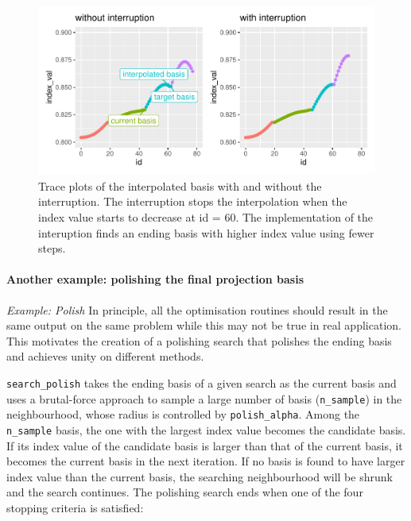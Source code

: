 \documentclass[12pt]{article}
\begin{document}
\begin{figure}
\centering
\includegraphics{paper_files/figure-latex/interruption-1.pdf}
\caption{\label{interruption}Trace plots of the interpolated basis with
and without the interruption. The interruption stops the interpolation
when the index value starts to decrease at id = 60. The implementation
of the interuption finds an ending basis with higher index value using
fewer steps.}
\end{figure}

\hypertarget{another-example-polishing-the-final-projection-basis}{%
\paragraph{Another example: polishing the final projection
basis}\label{another-example-polishing-the-final-projection-basis}}

\emph{Example: Polish} In principle, all the optimisation routines
should result in the same output on the same problem while this may not
be true in real application. This motivates the creation of a polishing
search that polishes the ending basis and achieves unity on different
methods.

\texttt{search\_polish} takes the ending basis of a given search as the
current basis and uses a brutal-force approach to sample a large number
of basis (\texttt{n\_sample}) in the neighbourhood, whose radius is
controlled by \texttt{polish\_alpha}. Among the \texttt{n\_sample}
basis, the one with the largest index value becomes the candidate basis.
If its index value of the candidate basis is larger than that of the
current basis, it becomes the current basis in the next iteration. If no
basis is found to have larger index value than the current basis, the
searching neighbourhood will be shrunk and the search continues. The
polishing search ends when one of the four stopping criteria is
satisfied:
\end{document}
